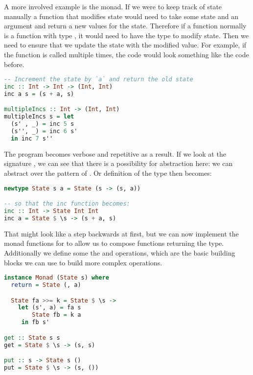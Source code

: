 A more involved example is the  monad. If we were to keep track of state manually a function that modifies state would need to take some state  and an argument and return a new values for the state. Therefore if a function  normally is a function with type , it would need to have the type  to modify state. Then we need to ensure that we update the state with the modified value. For example, if the function is called multiple times, the code would look something like the code before.

\begin{lstlisting}[language=haskell,style=fancy]
-- Increment the state by `a` and return the old state
inc :: Int -> Int -> (Int, Int)
inc a s = (s + a, s)

multipleIncs :: Int -> (Int, Int)
multipleIncs s = let
  (s' , _) = inc 5 s
  (s'', _) = inc 6 s'
  in inc 7 s''
\end{lstlisting}

The program becomes verbose and repetitive as a result. If we look at the signature , we can see that there is a possibility for abstraction here: we can abstract over the pattern of . Or definition of the  type then becomes:

\begin{lstlisting}[language=haskell,style=fancy]
newtype State s a = State (s -> (s, a))

-- so that the inc function becomes:
inc :: Int -> State Int Int
inc a = State $ \s -> (s + a, s)
\end{lstlisting}

That might look like a step backwards at first, but we can now implement the monad functions for  to allow us to compose functions returning the  type. Additionally we define some the  and  operations, which are the basic building blocks we can use to build more complex operations.

\begin{lstlisting}[language=haskell,style=fancy]
instance Monad (State s) where
  return = State (, a)

  State fa >>= k = State $ \s ->
    let (s', a) = fa s
        State fb = k a
     in fb s'

get :: State s s
get = State $ \s -> (s, s)

put :: s -> State s ()
put = State $ \s -> (s, ())
\end{lstlisting}


